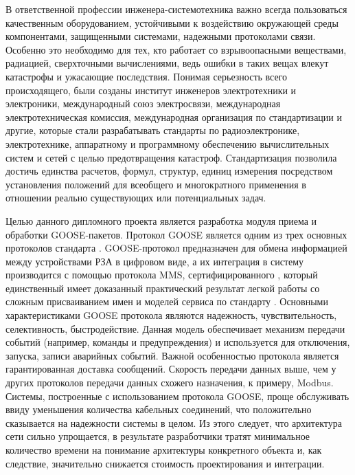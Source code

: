 \label{sec:intro}

В ответственной профессии инженера-системотехника важно всегда пользоваться
качественным оборудованием, устойчивыми к воздействию окружающей среды компонентами,
защищенными системами, надежными протоколами связи. Особенно это необходимо для тех,
кто работает со взрывоопасными веществами, радиацией, сверхточными вычислениями,
ведь ошибки в таких вещах влекут катастрофы и ужасающие последствия. Понимая серьезность всего происходящего, были созданы институт инженеров электротехники и электроники, международный союз электросвязи, международная электротехническая комиссия, международная организация по стандартизации и другие, которые стали разрабатывать стандарты по радиоэлектронике, электротехнике, аппаратному и программному обеспечению вычислительных систем и сетей
с целью предотвращения катастроф. Стандартизация позволила достичь единства расчетов, формул, структур, единиц измерения посредством установления положений для всеобщего и многократного применения в отношении реально существующих или потенциальных задач.

Целью данного дипломного проекта является разработка модуля приема и обработки GOOSE-пакетов. Протокол GOOSE является одним из трех основных протоколов стандарта . GOOSE-протокол предназначен для обмена информацией между устройствами РЗА в цифровом виде, а их интеграция в систему производится
с помощью протокола MMS, сертифицированного \iso, который единственный имеет доказанный
практический результат легкой работы со сложным присваиванием имен и моделей
сервиса по стандарту \iecStd. Основными характеристиками GOOSE протокола являются надежность, чувствительность, селективность, быстродействие. Данная модель обеспечивает механизм передачи событий (например, команды и предупреждения) и используется для отключения, запуска, записи аварийных событий. Важной особенностью протокола является гарантированная доставка сообщений. Скорость передачи данных выше, чем у других протоколов передачи данных схожего назначения, к примеру, Modbus. Системы, построенные с использованием протокола GOOSE, проще обслуживать ввиду уменьшения количества кабельных соединений, что положительно сказывается на надежности системы в целом. Из этого следует, что архитектура сети сильно упрощается, в результате разработчики тратят минимальное количество времени на понимание архитектуры конкретного объекта и, как следствие, значительно снижается стоимость проектирования и интеграции.


